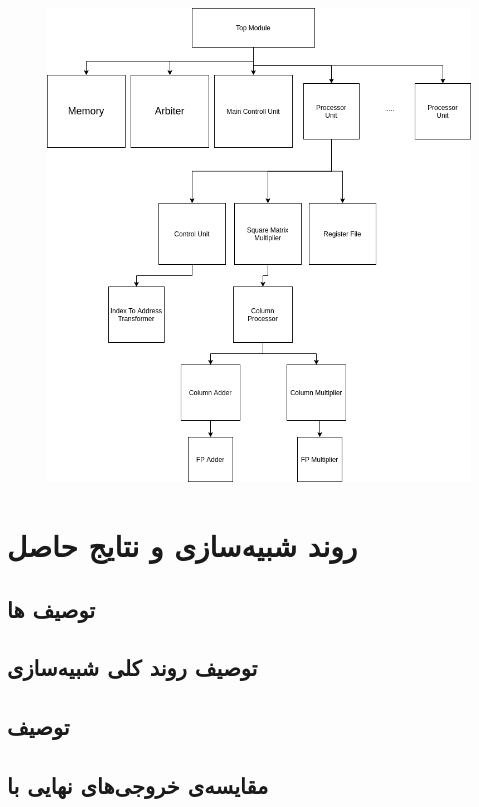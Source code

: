 \documentclass[12pt,onecolumn,a4paper,fleqn]{article}
\begin{document}
	\begin{figure}[h]
	\centering
	\includegraphics[width=0.87\linewidth]{source/tree.png}
	\caption{}
\end{figure}

\pagebreak
\section{روند شبیه‌سازی و نتایج حاصل}
\subsection{توصیف ها}
\subsection{توصیف روند کلی شبیه‌سازی}
\subsection{توصیف }
\subsection{مقایسه‌ی خروجی‌های نهایی با }
\end{document}

